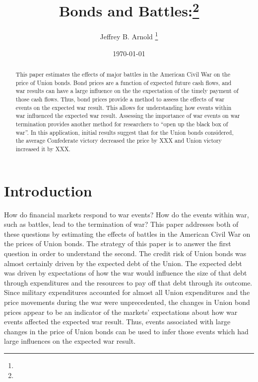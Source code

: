 \documentclass[11pt, oneside, article]{memoir}
\author{Jeffrey B. Arnold \thanks{\affiliations}}
\date{\today{}}
\title{Bonds and Battles:\thanks{\thanksnote}}
\begin{document}
\begin{titlingpage}
\maketitle{}

\begin{abstract}
\footnotesize
This paper estimates the effects of major battles in the American Civil War on the price of Union bonds.
Bond prices are a function of expected future cash flows, and war results can have a large influence on the the expectation of the timely payment of those cash flows.
Thus, bond prices provide a method to assess the effects of war events on the expected war result.
This allows for understanding how events within war influenced the expected war result.
Assessing the importance of war events on war termination provides another method for researchers to ``open up the black box of war''.
In this application, initial results suggest that for the Union bonds considered, the average Confederate victory decreased the price by XXX and Union victory increased it by XXX.
\end{abstract}

\end{titlingpage}

\section{Introduction}
\label{sec:introduction}

How do financial markets respond to war events?
How do the events within war, such as battles, lead to the termination of war?
This paper addresses both of these questions by estimating the effects of battles in the American Civil War on the prices of Union bonds.
The strategy of this paper is to answer the first question in order to understand the second.
The credit risk of Union bonds was almost certainly driven by the expected debt of the Union.
The expected debt was driven by expectations of how the war would influence the size of that debt through expenditures and the resources to pay off that debt through its outcome.
Since military expenditures accounted for almost all Union expenditures and the price movements during the war were unprecedented, the changes in Union bond prices appear to be an indicator of the markets' expectations about how war events affected the expected war result.
Thus, events associated with large changes in the price of Union bonds can be used to infer those events which had large influences on the expected war result.
\end{document}
